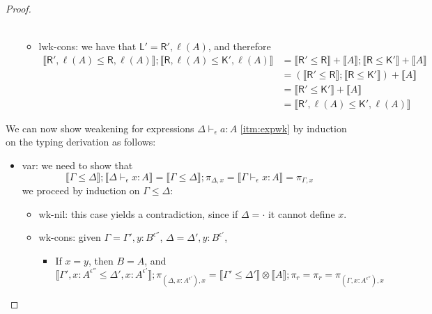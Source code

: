 \documentclass[acmsmall,screen,review]{acmart}
\newcommand{\ms}[1]{\ensuremath{\mathsf{#1}}}
\newcommand{\thyp}[3]{#1 : {#2}^{#3}}
\newcommand{\hasty}[4]{#1 \vdash_{#2} #3: {#4}}
\newcommand{\brle}[1]{{\textsf{#1}}}
\newcommand{\dnt}[1]{\llbracket{#1}\rrbracket}
\begin{document}
\begin{proof}
\begin{itemize}
\begin{itemize}
\begin{equation}
\begin{aligned}
        \end{aligned}
      \end{equation}
      \item \brle{lwk-cons}: we have that $\ms{L}' = \ms{R}', \ell(A)$, and therefore
      \begin{equation}
        \begin{aligned}
        \dnt{\ms{R}', \ell(A) \leq \ms{R}, \ell(A)} ; \dnt{\ms{R}, \ell(A) \leq \ms{K}', \ell(A)}
        & = \dnt{\ms{R}' \leq \ms{R}} + \dnt{A} ; \dnt{\ms{R} \leq \ms{K}'} + \dnt{A} \\
        & = (\dnt{\ms{R}' \leq \ms{R}} ; \dnt{\ms{R} \leq \ms{K}'}) + \dnt{A} \\
        & = \dnt{\ms{R}' \leq \ms{K}'} + \dnt{A} \\
        & = \dnt{\ms{R}', \ell(A) \leq \ms{K}', \ell(A)}
        \end{aligned}
      \end{equation}
    \end{itemize}
  \end{itemize}
  We can now show weakening for expressions $\hasty{\Delta}{\epsilon}{a}{A}$ \ref{itm:expwk} by 
  induction on the typing derivation as follows:
  \begin{itemize}
    \item \brle{var}: we need to show that
    \begin{equation}
      \dnt{\Gamma \leq \Delta} ; \dnt{\hasty{\Delta}{\epsilon}{x}{A}}
      = \dnt{\Gamma \leq \Delta} ; \pi_{\Delta, x}
      = \dnt{\hasty{\Gamma}{\epsilon}{x}{A}}
      = \pi_{\Gamma, x}
    \end{equation}
    we proceed by induction on $\Gamma \leq \Delta$:
    \begin{itemize}
      \item \brle{wk-nil}: this case yields a contradiction, since if $\Delta = \cdot$ it cannot
      define $x$.
      \item \brle{wk-cons}: given $\Gamma = \Gamma', \thyp{y}{B}{\epsilon''}$, $\Delta = \Delta',
      \thyp{y}{B}{\epsilon'}$,
      \begin{itemize}
        \item If $x = y$, then $B = A$, and
        \begin{equation}
          \dnt{\Gamma', \thyp{x}{A}{\epsilon''} \leq \Delta', \thyp{x}{A}{\epsilon'}} 
          ; \pi_{(\Delta, \thyp{x}{A}{\epsilon'}), x}
          = \dnt{\Gamma' \leq \Delta'} \otimes \dnt{A} ; \pi_r
          = \pi_r
          = \pi_{(\Gamma, \thyp{x}{A}{\epsilon''}), x}

\end{equation}
\end{itemize}
\end{itemize}
\end{itemize}
\end{proof}
\end{document}
